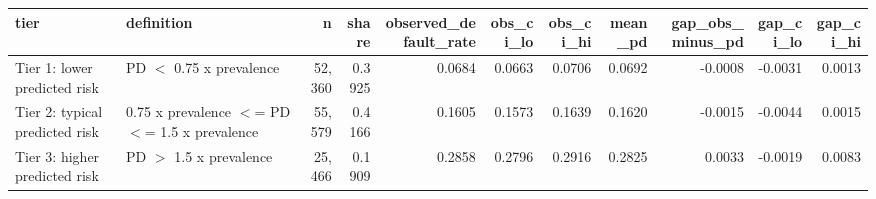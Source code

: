 \begin{tabular}{llrrrrrrrrr}
\toprule
tier & definition & n & share & observed\_default\_rate & obs\_ci\_lo & obs\_ci\_hi & mean\_pd & gap\_obs\_minus\_pd & gap\_ci\_lo & gap\_ci\_hi \\
\midrule
Tier 1: lower predicted risk & PD $<$ 0.75 x prevalence & 52,360 & 0.3925 & 0.0684 & 0.0663 & 0.0706 & 0.0692 & -0.0008 & -0.0031 & 0.0013 \\
Tier 2: typical predicted risk & 0.75 x prevalence $<$= PD $<$= 1.5 x prevalence & 55,579 & 0.4166 & 0.1605 & 0.1573 & 0.1639 & 0.1620 & -0.0015 & -0.0044 & 0.0015 \\
Tier 3: higher predicted risk & PD $>$ 1.5 x prevalence & 25,466 & 0.1909 & 0.2858 & 0.2796 & 0.2916 & 0.2825 & 0.0033 & -0.0019 & 0.0083 \\
\bottomrule
\end{tabular}
